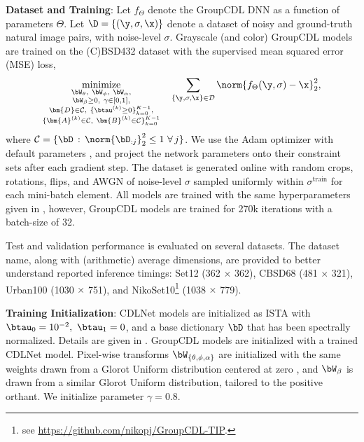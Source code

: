 \documentclass[lettersize,journal]{IEEEtran}
\newcommand{\sigmatrain}{\sigma^{\mathrm{train}}}
\begin{document}
\textbf{Dataset and Training}:
Let $f_\Theta$ denote the GroupCDL DNN as a function of
parameters $\Theta$. Let $\D = \{(\y, \sigma, \x)\}$ denote a dataset of noisy and
ground-truth natural image pairs, with noise-level $\sigma$. Grayscale (and color) GroupCDL models are trained on
the (C)BSD432 \cite{bsd} dataset with the supervised mean squared
error (MSE) loss,
\begin{equation} \label{eqn:mse}
\underset{
\substack{
\bW_\theta, ~ \bW_\phi,~\bW_\alpha,\\
 \bW_\beta \geq 0,  ~ \gamma \in [0, 1], \\
\bm{D} \in \mathcal{C}, ~ \{ \btau^{(k)} \geq 0 \}_{k=0}^{K-1}, \\
\{ \bm{A}^{(k)} \in \mathcal{C}, ~ \bm{B}^{(k)} \in \mathcal{C} \}_{k=0}^{K-1}
}
}{\mathrm{minimize}} \quad \sum_{\{\y, \sigma, \x\} \in \mathcal{D}} 
\norm{f_{\Theta}(\y, \sigma) - \x}_2^2,
\end{equation}
where $\mathcal{C} = \{ \bD \, : \, \norm{\bD_{:j}}_2^2 \leq 1 ~
\forall \, j \}$. We use the Adam
optimizer with default parameters \cite{adam}, and project the network parameters
onto their constraint sets after each gradient step.
The dataset is generated online with random crops, rotations, flips, and
AWGN of noise-level $\sigma$ sampled uniformly within $\sigmatrain$ for each mini-batch element. All models are trained with the same hyperparameters given in
\cite{janjusevicCDLNet2022}, however, GroupCDL models are trained for 270k
iterations with a batch-size of 32.

Test and validation performance is evaluated on several datasets. The dataset name, along with (arithmetic) average 
dimensions, are provided to better understand reported inference timings: Set12 (362 $\times$ 362), CBSD68 \cite{bsd} (481 $\times$ 321), Urban100 \cite{Urban100} (1030 $\times$ 751), and 
NikoSet10\footnote{see \href{https://github.com/nikopj/GroupCDL-TIP}{https://github.com/nikopj/GroupCDL-TIP}.} (1038 $\times$ 779).

\textbf{Training Initialization}:
CDLNet models are initialized as ISTA with $\btau_0 = 10^{-2}, ~ \btau_1 = 0$, and
a base dictionary $\bD$ that has been spectrally normalized. Details are given
in \cite{janjusevicCDLNet2022}. GroupCDL models are initialized with a trained
CDLNet model. Pixel-wise transforms $\bW_{\{\theta, \phi, \alpha\}}$ are initialized with the same weights drawn from a Glorot Uniform distribution centered at zero \cite{glorot}, and $\bW_\beta$ is drawn from a similar Glorot Uniform distribution, tailored to the positive orthant. We initialize parameter $\gamma = 0.8$.
\end{document}
